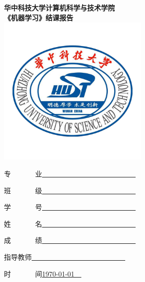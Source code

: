 \begin{titlepage}

\begin{center}


 

{\huge \bfseries 华中科技大学计算机科学与技术学院}\\[1.5cm]

{ \huge \bfseries 《机器学习》结课报告}\\[1.5cm]

\includegraphics[width=0.55\textwidth]{figure/logo1.png}\\[1.5cm]   






\begin{minipage}{0.5\textwidth}
\large
{\heiti 专~~~~~~~业}\quad \underline{~~~~~~~~~~~~~~~~~~~~~~~~~~~}

{\heiti 班~~~~~~~级}\quad \underline{~~~~~~~~~~~~~~~~~~~~~~~~~~~}

{\heiti 学~~~~~~~号}\quad \underline{~~~~~~~~~~~~~~~~~~~~~~~~~~~}

{\heiti 姓~~~~~~~名}\quad \underline{~~~~~~~~~~~~~~~~~~~~~~~~~~~}

{\heiti 成~~~~~~~绩}\quad \underline{~~~~~~~~~~~~~~~~~~~~~~~~~~~}

{\heiti 指导教师}\quad \underline{~~~~~~~~~~~~~~~~~~~~~~~~~~~}

{\heiti 时~~~~~~~间}\quad \underline{\today~~}
\end{minipage}

\vfill

\end{center}

\end{titlepage}
